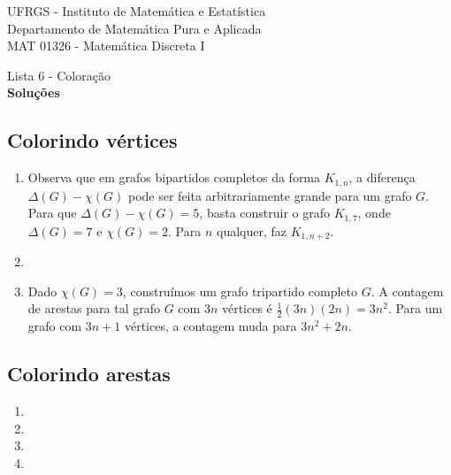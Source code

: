 \documentclass{article}
\begin{document}
\begin{flushleft}
    UFRGS - Instituto de Matemática e Estatística \\
    Departamento de Matemática Pura e Aplicada \\
    MAT 01326 - Matemática Discreta I \\
\end{flushleft}
\vspace{0.25cm}

\begin{center}
    {\LARGE Lista 6 - Coloração} \\
    \vspace{0.4cm}
    {\large \textbf{Soluções}}

\end{center}

\subsection*{Colorindo vértices}

\begin{enumerate}
    \item [\textbf{E1}] Observa que em grafos bipartidos completos da forma \(K_{1,n}\), a diferença \(\Delta(G) - \chi(G)\) pode ser feita arbitrariamente grande para um grafo \(G\). Para que \(\Delta(G)-\chi(G)=5\), basta construir o grafo \(K_{1,7}\), onde \(\Delta(G)=7\) e \(\chi(G)=2\). Para \(n\) qualquer, faz \(K_{1, n+2}\).
    \item [\textbf{E2}]
    \item [\textbf{E3}] Dado \(\chi(G)=3\), construímos um grafo tripartido completo \(G\). A contagem de arestas para tal grafo \(G\) com \(3n\) vértices é \(\frac{1}{2}(3n)(2n)=3n^2\). Para um grafo com \(3n+1\) vértices, a contagem muda para \(3n^2+2n\).
\end{enumerate}

\subsection*{Colorindo arestas}

\begin{enumerate}
    \item [\textbf{E5}]
    \item [\textbf{E6}]
    \item [\textbf{E7}]
    \item [\textbf{E8}]
\end{enumerate}
\end{document}
